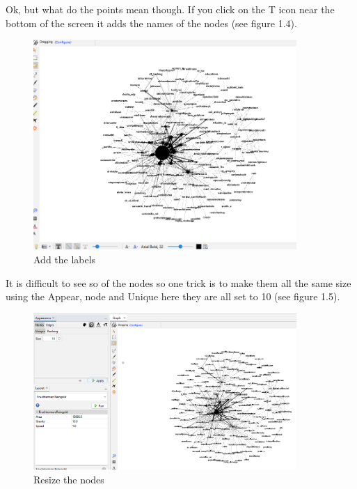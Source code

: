 Ok, but what do the points mean though. If you click on the T icon near the bottom of the screen it adds the names of the nodes (see figure 1.4).
\begin{figure}
    \centering
    \includegraphics[width=10cm]{chapter/Chpsocioviz1/gephi5.png}
    \caption{Add the labels}
    \label{fig:addlabels}
\end{figure}
It is difficult to see so of the nodes so one trick is to make them all the same size using the Appear, node and Unique here they are all set to 10 (see figure 1.5).
\begin{figure}
    \centering
    \includegraphics[width=10cm]{chapter/Chpsocioviz1/gephi6.png}
    \caption{Resize the nodes}
    \label{fig:nodes resize}
\end{figure}
